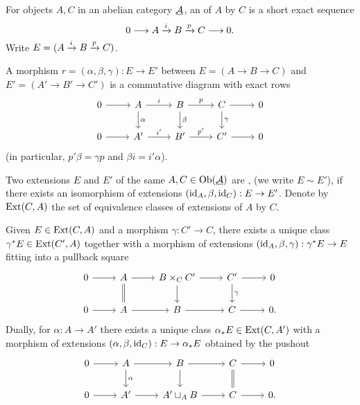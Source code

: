 \begin{definitions*}
	\item For objects \( A,C \) in an abelian category \( \underline{\mathcal A} \), an  of \( A \) by \( C \) is a short exact sequence
		\[
			0 \longrightarrow A \xrightarrow{i} B \xrightarrow{p} C \longrightarrow 0.
		\]
		Write \( E=(A\xrightarrow{i}B\xrightarrow{p}C) \).

	\item A morphism \( r=(\alpha,\beta,\gamma): E\to E' \) between
		\( E=(A\to B\to C) \) and \( E'=(A'\to B'\to C') \) is a commutative diagram with exact rows
		\[
			\begin{tikzcd}
				0 \arrow[r] & A \arrow[r,"i"] \arrow[d,"\alpha"] & B \arrow[r,"p"] \arrow[d,"\beta"] & C \arrow[r] \arrow[d,"\gamma"] & 0 \\
				0 \arrow[r] & A' \arrow[r,"i'"] & B' \arrow[r,"p'"] & C' \arrow[r] & 0
			\end{tikzcd}
		\]
		(in particular, \( p'\beta=\gamma p \) and \( \beta i = i'\alpha \)).

	\item Two extensions \( E \) and \( E' \) of the same \( A,C \in \operatorname{Ob}(\underline{\mathcal A}) \) are , (we write \( E\sim E' \)), if there exists an isomorphism of extensions \( (\mathrm{id}_A,\beta,\mathrm{id}_C):E\to E' \). Denote by \( \operatorname{Ext}(C,A) \) the set of equivalence classes of extensions of \( A \) by \( C \).
\end{definitions*}


Given \( E\in\operatorname{Ext}(C,A) \) and a morphism \( \gamma: C'\to C \), there exists a unique class \( \gamma^{*}E\in\operatorname{Ext}(C',A) \) together with a morphism of extensions \( (\mathrm{id}_A,\beta,\gamma): \gamma^{*}E \to E \) fitting into a pullback square
\[
	\begin{tikzcd}
		0 \arrow[r] & A \arrow[r] \arrow[d,equals] & B\times_{C} C' \arrow[r] \arrow[d] & C' \arrow[r] \arrow[d,"\gamma"] & 0 \\
		0 \arrow[r] & A \arrow[r] & B \arrow[r] & C \arrow[r] & 0.
	\end{tikzcd}
\]
Dually, for \( \alpha: A\to A' \) there exists a unique class \( \alpha_{*}E\in\operatorname{Ext}(C,A') \) with a morphism of extensions \( (\alpha,\beta,\mathrm{id}_C): E\to \alpha_{*}E \) obtained by the pushout
\[
	\begin{tikzcd}
		0 \arrow[r] & A \arrow[r] \arrow[d,"\alpha"] & B \arrow[r] \arrow[d] & C \arrow[r] \arrow[d,equals] & 0 \\
		0 \arrow[r] & A' \arrow[r] & A'\sqcup_{A} B \arrow[r] & C \arrow[r] & 0 .
	\end{tikzcd}
\]


